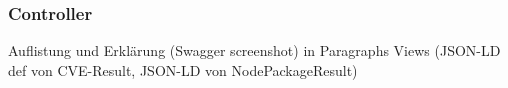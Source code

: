 \subsubsection{Controller} \label{subsubsec:Controller}
Auflistung und Erklärung (Swagger screenshot) in Paragraphs
Views (JSON-LD def von CVE-Result, JSON-LD von NodePackageResult)
